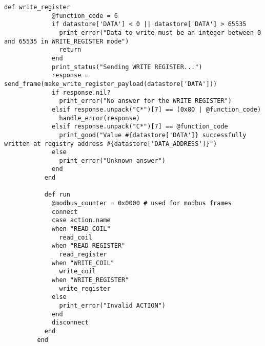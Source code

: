\documentclass[article,msc=informatik,type=msc,colorback,accentcolor=tud9c]{tudthesis}
\begin{document}
\begin{appendix}
\begin{lstlisting}[caption=Metasploit script of Writing into Modbus Registers, label=lst:Modbusclinet]
  	       def write_register
  	         @function_code = 6
  	         if datastore['DATA'] < 0 || datastore['DATA'] > 65535
  	           print_error("Data to write must be an integer between 0 and 65535 in WRITE_REGISTER mode")
  	           return
  	         end
  	         print_status("Sending WRITE REGISTER...")
  	         response = send_frame(make_write_register_payload(datastore['DATA']))
  	         if response.nil?
  	           print_error("No answer for the WRITE REGISTER")
  	         elsif response.unpack("C*")[7] == (0x80 | @function_code)
  	           handle_error(response)
  	         elsif response.unpack("C*")[7] == @function_code
  	           print_good("Value #{datastore['DATA']} successfully written at registry address #{datastore['DATA_ADDRESS']}")
  	         else
  	           print_error("Unknown answer")
  	         end
  	       end
  	     
  	       def run
  	         @modbus_counter = 0x0000 # used for modbus frames
  	         connect
  	         case action.name
  	         when "READ_COIL"
  	           read_coil
  	         when "READ_REGISTER"
  	           read_register
  	         when "WRITE_COIL"
  	           write_coil
  	         when "WRITE_REGISTER"
  	           write_register
  	         else
  	           print_error("Invalid ACTION")
  	         end
  	         disconnect
  	       end
  	     end
  	     
  	     \end{lstlisting}
  	      
  	  
  	\end{appendix}
 	
 	
 	
    \newpage      
    
      
      
      
      
      
      
      \newpage
     
     
      
      \printglossaries     
             
     
      
\end{document}
